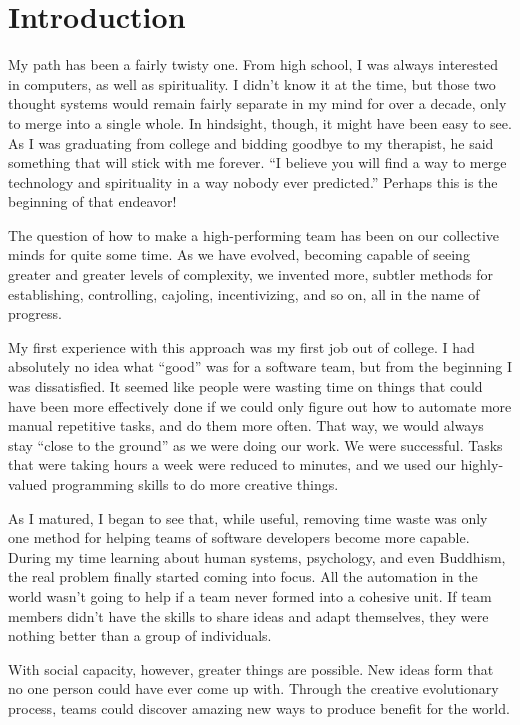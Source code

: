 \chapter{Introduction}

My path has been a fairly twisty one. From high school, I was always interested in computers, as well as
spirituality. I didn't know it at the time, but those two thought systems would remain fairly separate in my mind
for over a decade, only to merge into a single whole. In hindsight, though, it might have been easy to see. As I 
was graduating from college and bidding goodbye to my therapist, he said something that will stick with me 
forever. ``I believe you will find a way to merge technology and spirituality in a way nobody ever predicted.'' 
Perhaps this is the beginning of that endeavor!

The question of how to make a high-performing team has been on our collective minds for quite some time.
As we have evolved, becoming capable of seeing greater and greater levels of complexity, we invented
more, subtler methods for establishing, controlling, cajoling, incentivizing, and so on, all in the name of progress.

My first experience with this approach was my first job out of college. I had absolutely no idea what ``good''
was for a software team, but from the beginning I was dissatisfied. It seemed like people were wasting time on 
things that could have been more effectively done if we could only figure out how to automate more manual
repetitive tasks, and do them more often. That way, we would always stay ``close to the ground'' as we were
doing our work. We were successful. Tasks that were taking hours a week were reduced to minutes, and 
we used our highly-valued programming skills to do more creative things.

As I matured, I began to see that, while useful, removing time waste was only one method for helping
teams of software developers become more capable. During my time learning about human systems, 
psychology, and even Buddhism, the real problem finally started coming into focus. All the automation in
the world wasn't going to help if a team never formed into a cohesive unit. If team members didn't have the
skills to share ideas and adapt themselves, they were nothing better than a group of individuals. 

With social capacity, however, greater things are possible. New ideas form that no one person could have
ever come up with. Through the creative evolutionary process, teams could discover amazing new ways
to produce benefit for the world.

